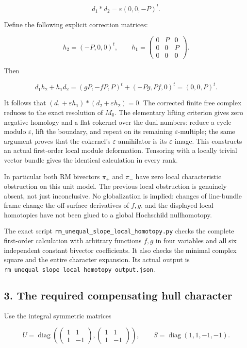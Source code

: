 \[
 d_1*d_2=\varepsilon(0,0,-P)^t.
\]

Define the following explicit correction matrices:

\[
 h_2=(-P,0,0)^t,
 \qquad
 h_1=\begin{pmatrix}0&P&0\\0&0&P\\0&0&0\end{pmatrix}.
 \tag{US.6}
\]

Then

\[
 d_1h_2+h_1d_2=(gP,-fP,P)^t+(-Pg,Pf,0)^t=(0,0,P)^t.
 \tag{US.7}
\]

It follows that \((d_1+\varepsilon h_1)*(d_2+\varepsilon h_2)=0\). The
corrected finite free complex reduces to the exact resolution of
\(M_0\). The elementary lifting criterion gives zero negative homology
and a flat cokernel over the dual numbers: reduce a cycle modulo
\(\varepsilon\), lift the boundary, and repeat on its remaining
\(\varepsilon\)-multiple; the same argument proves that the cokernel's
\(\varepsilon\)-annihilator is its \(\varepsilon\)-image. This
constructs an actual first-order local module deformation. Tensoring
with a locally trivial vector bundle gives the identical calculation in
every rank.

In particular both RM bivectors \(\pi_+\) and \(\pi_-\) have zero local
characteristic obstruction on this unit model. The previous local
obstruction is genuinely absent, not just inconclusive. No globalization
is implied: changes of line-bundle frame change the off-surface
derivatives of \(f,g\), and the displayed local homotopies have not been
glued to a global Hochschild nullhomotopy.

The exact script \texttt{rm\_unequal\_slope\_local\_homotopy.py} checks
the complete first-order calculation with arbitrary functions \(f,g\) in
four variables and all six independent constant bivector coefficients.
It also checks the minimal complex square and the entire character
expansion. Its actual output is
\texttt{rm\_unequal\_slope\_local\_homotopy\_output.json}.

\subsection{3. The required compensating hull
character}\label{SF-US-the-required-compensating-hull-character}

Use the integral symmetric matrices

\[
 U=\operatorname{diag}\!\left(
 \begin{pmatrix}1&1\\1&-1\end{pmatrix},
 \begin{pmatrix}1&1\\1&-1\end{pmatrix}\right),
 \qquad S=\operatorname{diag}(1,1,-1,-1).
\]

